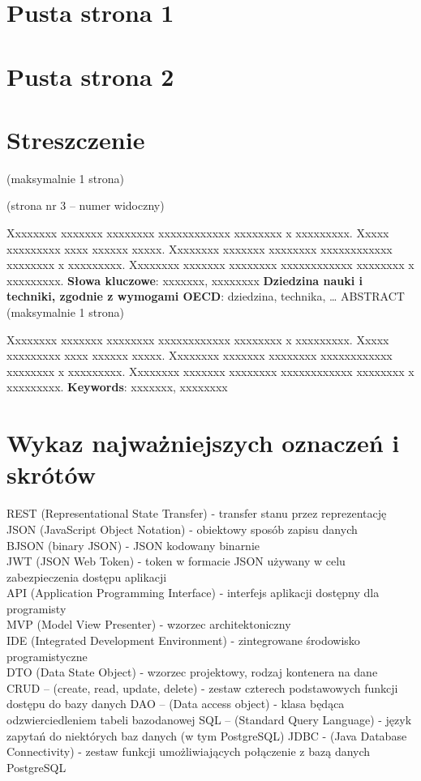 \documentclass[10pt,twoside,a4paper]{report}
\begin{document}
\chapter*{Pusta strona 1}
\chapter*{Pusta strona 2}
\renewcommand{\familydefault}{\sfdefault}
\chapter*{Streszczenie}
(maksymalnie 1 strona)\par
(strona nr 3 – numer widoczny)\par
Xxxxxxxx xxxxxxx xxxxxxxx xxxxxxxxxxxx xxxxxxxx x xxxxxxxxx. Xxxxx xxxxxxxxx xxxx xxxxxx xxxxx. Xxxxxxxx xxxxxxx xxxxxxxx xxxxxxxxxxxx xxxxxxxx x xxxxxxxxx. Xxxxxxxx xxxxxxx xxxxxxxx xxxxxxxxxxxx xxxxxxxx x xxxxxxxxx. 
\newline\textbf{Słowa kluczowe}: xxxxxxx, xxxxxxxx
\newline\textbf{Dziedzina nauki i techniki, zgodnie z wymogami OECD}: 
dziedzina, technika, …
\newline ABSTRACT (maksymalnie 1 strona)
\par Xxxxxxxx xxxxxxx xxxxxxxx xxxxxxxxxxxx xxxxxxxx x xxxxxxxxx. Xxxxx xxxxxxxxx xxxx xxxxxx xxxxx. Xxxxxxxx xxxxxxx xxxxxxxx xxxxxxxxxxxx xxxxxxxx x xxxxxxxxx. Xxxxxxxx xxxxxxx xxxxxxxx xxxxxxxxxxxx xxxxxxxx x xxxxxxxxx.
\newline\textbf{Keywords}: xxxxxxx, xxxxxxxx

\tableofcontents
\chapter*{Wykaz najważniejszych oznaczeń i skrótów}
\noindent REST (Representational State Transfer) - transfer stanu przez reprezentację \\
JSON (JavaScript Object Notation) - obiektowy sposób zapisu danych \\
BJSON (binary JSON) - JSON kodowany binarnie \\
JWT (JSON Web Token) - token w formacie JSON używany w celu zabezpieczenia dostępu aplikacji \\
API (Application Programming Interface) - interfejs aplikacji dostępny dla programisty \\
MVP (Model View Presenter) - wzorzec architektoniczny\\
IDE (Integrated Development Environment) - zintegrowane środowisko programistyczne\\
DTO (Data State Object) - wzorzec projektowy, rodzaj kontenera na dane\\
CRUD – (create, read, update, delete) - zestaw czterech podstawowych funkcji dostępu do bazy danych
DAO – (Data access object) - klasa będąca odzwierciedleniem tabeli bazodanowej
SQL – (Standard Query Language) - język zapytań do niektórych baz danych (w tym PostgreSQL)
JDBC - (Java Database Connectivity) - zestaw funkcji umożliwiających połączenie z bazą danych PostgreSQL
\end{document}
